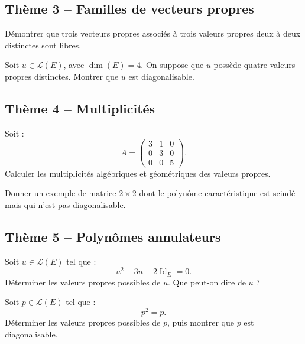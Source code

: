 \documentclass[11pt,a4paper]{article}
\newcommand{\Lcal}{\mathcal L}
\newcommand{\Id}{\operatorname{Id}}
\begin{document}
\subsection*{Thème 3 -- Familles de vecteurs propres}

\begin{exercicebox}[6]
Démontrer que trois vecteurs propres associés à trois valeurs propres deux à deux distinctes sont libres.
\end{exercicebox}

\begin{exercicebox}[7]
Soit \(u\in\Lcal(E)\), avec \(\dim(E)=4\).  
On suppose que \(u\) possède quatre valeurs propres distinctes.  
Montrer que \(u\) est diagonalisable.
\end{exercicebox}

\subsection*{Thème 4 -- Multiplicités}

\begin{exercicebox}[8]
Soit :
\[
A=
\begin{pmatrix}
3&1&0\\
0&3&0\\
0&0&5
\end{pmatrix}.
\]
Calculer les multiplicités algébriques et géométriques des valeurs propres.
\end{exercicebox}

\begin{exercicebox}[9]
Donner un exemple de matrice \(2\times2\) dont le polynôme caractéristique est scindé mais qui n'est pas diagonalisable.
\end{exercicebox}

\subsection*{Thème 5 -- Polynômes annulateurs}

\begin{exercicebox}[10]
Soit \(u\in\Lcal(E)\) tel que :
\[
u^2-3u+2\Id_E=0.
\]
Déterminer les valeurs propres possibles de \(u\).  
Que peut-on dire de \(u\) ?
\end{exercicebox}

\begin{exercicebox}[11]
Soit \(p\in\Lcal(E)\) tel que :
\[
p^2=p.
\]
Déterminer les valeurs propres possibles de \(p\), puis montrer que \(p\) est diagonalisable.
\end{exercicebox}
\end{document}
